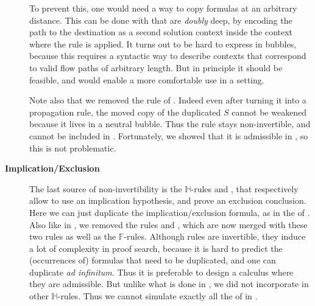 \begin{description}
    To prevent this, one would need a way to copy formulas at an arbitrary
    distance. This can be done with  that are \emph{doubly} deep,
    by encoding the path to the destination as a second solution context inside
    the context where the rule is applied. It turns out
    to be hard to express in bubbles, because this requires a syntactic way to
    describe contexts that correspond to valid flow paths of arbitrary
    length. But in
    principle it should be feasible, and would enable a more comfortable use in
    a  setting.

    Note also that we removed the  rule of .
    Indeed even after turning it into a propagation rule, the moved copy of the
    duplicated  $S$ cannot be weakened because it lives in a neutral
    bubble. Thus the rule stays non-invertible, and cannot be included in
    . Fortunately, we showed that it is admissible in
    , so this is not problematic.

  \item[\textbf{Implication/Exclusion}]
    The last source of non-invertibility is the $\mathbb{H}$-rules
    \rsf{{\limp}{-}} and \rsf{{\lsub}{+}}, that respectively allow to use an
    implication hypothesis, and prove an exclusion conclusion.
    Here we can just duplicate the implication/exclusion formula, as in the
     of . Also like in , we removed
    the  rules  and , which are now merged with
    these two rules as well as the $\mathbb{F}$-rules. Although 
    rules are invertible, they induce a lot of complexity in proof search,
    because it is hard to predict the (occurrences of) formulas that need to be
    duplicated, and one can duplicate \emph{ad infinitum}. Thus it is preferable
    to design a calculus where they are admissible. But unlike what is done in
    , we did not incorporate  in other
    $\mathbb{H}$-rules. Thus we cannot simulate exactly all the  of  in .

\end{description}

